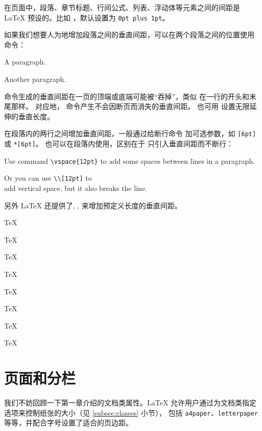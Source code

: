 在页面中，段落、章节标题、行间公式、列表、浮动体等元素之间的间距是 \LaTeX{} 预设的。比如 ，默认设置为 \texttt{0pt plus 1pt}。

如果我们想要人为地增加段落之间的垂直间距，可以在两个段落之间的位置使用  命令：
\begin{example}
A paragraph.

\vspace{2ex}
Another paragraph.
\end{example}

 命令生成的垂直间距在一页的顶端或底端可能被“吞掉”，类似  在一行的开头和末尾那样。
对应地， 命令产生不会因断页而消失的垂直间距。 也可用  设置无限延伸的垂直长度。

在段落内的两行之间增加垂直间距，一般通过给断行命令 \crcmd{} 加可选参数，如 \crcmd\texttt{[6pt]} 或 \crcmd\texttt{*[6pt]}。
 也可以在段落内使用，区别在于  只引入垂直间距而不断行：
\begin{example}
Use command \verb|\vspace{12pt}|
to add \vspace{12pt} some spaces
between lines in a paragraph.

Or you can use \verb|\\[12pt]|
to \\[12pt] add vertical space,
but it also breaks the line.
\end{example}

另外 \LaTeX{} 还提供了, ,  来增加预定义长度的垂直间距。
\begin{example}
\parbox[t]{3em}{TeX\par TeX}
\parbox[t]{3em}{TeX\par\smallskip TeX}
\parbox[t]{3em}{TeX\par\medskip TeX}
\parbox[t]{3em}{TeX\par\bigskip TeX}
\end{example}

\section{页面和分栏}\label{sec:page-columns}

我们不妨回顾一下第一章介绍的文档类属性。\LaTeX{} 允许用户通过为文档类指定选项来控制纸张的大小（见 \ref{subsec:classes} 小节），
包括 \texttt{a4paper}、\texttt{letterpaper}等等，并配合字号设置了适合的页边距。

